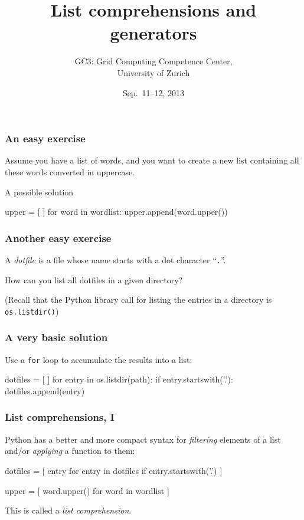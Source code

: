 \documentclass[english,serif,mathserif,xcolor=pdftex,dvipsnames,table]{beamer}
\title[Part 7]{%
  List comprehensions and generators
}
\author[GC3]{%
  GC3: Grid Computing Competence Center, \\
  University of Zurich
}
\date{Sep.~11--12, 2013}
\begin{document}
\maketitle

\begin{frame}[fragile]
  \frametitle{An easy exercise}
  Assume you have a list of words, and you want to create a new list
  containing all these words converted in uppercase.

\pause
\+
A possible solution
\begin{python}
upper = [ ]
for word in wordlist:
  upper.append(word.upper())
\end{python}
\end{frame}


\begin{frame}
  \frametitle{Another easy exercise}
  A \emph{dotfile} is a file whose name starts with a dot character
  ``\texttt{.}''.

  \+
  How can you list all dotfiles in a given directory?

  \+
  (Recall that the Python library call for listing the entries in a
  directory is \texttt{os.listdir()})
\end{frame}


\begin{frame}[fragile]
  \frametitle{A very basic solution}
  Use a \lstinline|for| loop to accumulate the results into a list:
  \begin{python}
dotfiles = [ ]
for entry in os.listdir(path):
  if entry.startswith('.'):
    dotfiles.append(entry)
  \end{python}
\end{frame}


\begin{frame}[fragile]
  \frametitle{List comprehensions, I}
  Python has a better and more compact syntax for \emph{filtering} elements
  of a list and/or \emph{applying} a function to them:
  \begin{python}
dotfiles = [ entry for entry in dotfiles
             if entry.startswith('.') ]
  \end{python}
\+
\begin{python}
upper = [ word.upper() for word in wordlist ]
\end{python}

  \+
  This is called a \emph{list comprehension}.
\end{frame}
\end{document}
